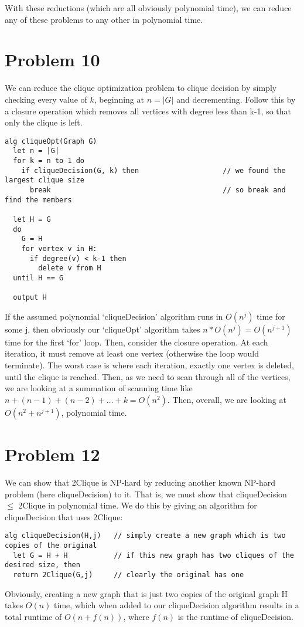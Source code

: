 \documentclass{article}
\providecommand{\prob}[1]{\section*{Problem #1}}
\begin{document}
With these reductions (which are all obviously polynomial time), we can reduce any of these problems to any other in polynomial time.

\pagebreak

\prob{10}
We can reduce the clique optimization problem to clique decision by simply checking every value of $k$,
beginning at $n = |G|$ and decrementing.
Follow this by a closure operation which removes all vertices with degree less than k-1,
so that only the clique is left.
\begin{lstlisting}
alg cliqueOpt(Graph G)
  let n = |G|
  for k = n to 1 do
    if cliqueDecision(G, k) then                    // we found the largest clique size
      break                                         // so break and find the members

  let H = G
  do
    G = H
    for vertex v in H:
      if degree(v) < k-1 then
        delete v from H
  until H == G

  output H
\end{lstlisting}
If the assumed polynomial `cliqueDecision' algorithm runs in $O(n^j)$ time for some j,
then obviously our `cliqueOpt' algorithm takes $n*O(n^j) = O(n^{j+1})$ time for the first `for' loop.
Then, consider the closure operation.
At each iteration, it must remove at least one vertex (otherwise the loop would terminate).
The worst case is where each iteration, exactly one vertex is deleted, until the clique is reached.
Then, as we need to scan through all of the vertices,
we are looking at a summation of scanning time like $n + (n-1) + (n-2) + \dots + k = O(n^2)$.
Then, overall, we are looking at $O(n^2 + n^{j+1})$, polynomial time.


\prob{12}
We can show that 2Clique is NP-hard by reducing another known NP-hard problem (here cliqueDecision) to it.
That is, we must show that cliqueDecision $\leq$ 2Clique in polynomial time.
We do this by giving an algorithm for cliqueDecision that uses 2Clique:
\begin{lstlisting}
alg cliqueDecision(H,j)   // simply create a new graph which is two copies of the original
  let G = H + H           // if this new graph has two cliques of the desired size, then
  return 2Clique(G,j)     // clearly the original has one
\end{lstlisting}
Obviously, creating a new graph that is just two copies of the original graph H takes $O(n)$ time, which when added to our cliqueDecision algorithm results in a total runtime of $O(n + f(n))$, where $f(n)$ is the runtime of cliqueDecision.
\end{document}
